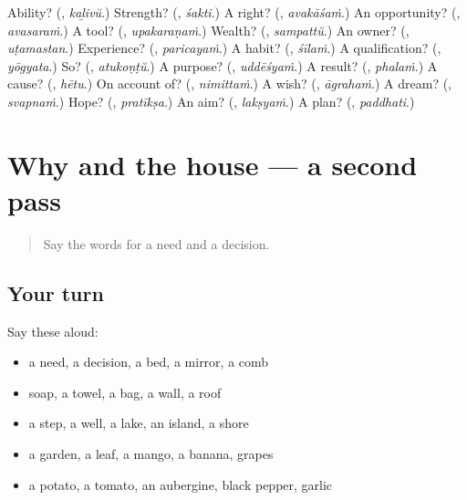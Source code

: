 \begin{tcolorbox}[breakable,colback=teal!4,colframe=teal!35!black,title={Before you move on}]
Ability? (\textbf{}, \emph{kaḻivŭ}.) Strength? (\textbf{}, \emph{śakti}.) A right? (\textbf{}, \emph{avakāśaṁ}.) An opportunity? (\textbf{}, \emph{avasaraṁ}.) A tool? (\textbf{}, \emph{upakaraṇaṁ}.) Wealth? (\textbf{}, \emph{sampattŭ}.) An owner? (\textbf{}, \emph{uṭamastan}.) Experience? (\textbf{}, \emph{paricayaṁ}.) A habit? (\textbf{}, \emph{śīlaṁ}.) A qualification? (\textbf{}, \emph{yōgyata}.) So? (\textbf{}, \emph{atukoṇṭŭ}.) A purpose? (\textbf{}, \emph{uddēśyaṁ}.) A result? (\textbf{}, \emph{phalaṁ}.) A cause? (\textbf{}, \emph{hētu}.) On account of? (\textbf{}, \emph{nimittaṁ}.) A wish? (\textbf{}, \emph{āgrahaṁ}.) A dream? (\textbf{}, \emph{svapnaṁ}.) Hope? (\textbf{}, \emph{pratīkṣa}.) An aim? (\textbf{}, \emph{lakṣyaṁ}.) A plan? (\textbf{}, \emph{paddhati}.)
\end{tcolorbox}
\section[(dialogue)]{Why and the house — a second pass}

\label{lesson:ML-R150-second-pass-why-and-the-house}



\begin{quote}
Say the words for a need and a decision.
\end{quote}

\subsection*{Your turn}
Say these aloud:

\begin{itemize}
\raggedright
  \item a need, a decision, a bed, a mirror, a comb
  \item soap, a towel, a bag, a wall, a roof
  \item a step, a well, a lake, an island, a shore
  \item a garden, a leaf, a mango, a banana, grapes
  \item a potato, a tomato, an aubergine, black pepper, garlic
\end{itemize}

